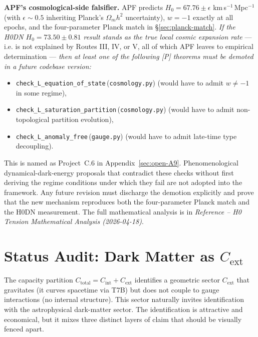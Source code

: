 \documentclass[11pt]{article}
\newcommand{\coderef}[2]{\texttt{#1}\,(\texttt{#2})}
\begin{document}
\begin{apfbox}
\textbf{APF's cosmological-side falsifier.} APF predicts
$H_0 = 67.76 \pm \epsilon$ km\,s$^{-1}$\,Mpc$^{-1}$ (with $\epsilon \sim
0.5$ inheriting Planck's $\Omega_m h^2$ uncertainty), $w = -1$ exactly
at all epochs, and the four-parameter Planck match in
\S\ref{sec:planck-match}. \emph{If the H0DN $H_0 = 73.50 \pm 0.81$
result stands as the true local cosmic expansion rate} --- i.e. is not
explained by Routes III, IV, or V, all of which APF leaves to empirical
determination --- \emph{then at least one of the following [P] theorems
must be demoted in a future codebase version:}
\begin{itemize}[leftmargin=1.5em,nosep]
    \item \coderef{check\_L\_equation\_of\_state}{cosmology.py}
    (would have to admit $w \neq -1$ in some regime),
    \item \coderef{check\_L\_saturation\_partition}{cosmology.py}
    (would have to admit non-topological partition evolution),
    \item \coderef{check\_L\_anomaly\_free}{gauge.py} (would have to
    admit late-time type decoupling).
\end{itemize}
This is named as Project~C.6 in Appendix~\ref{sec:open-A9}.
Phenomenological dynamical-dark-energy proposals that contradict these
checks without first deriving the regime conditions under which they
fail are not adopted into the framework. Any future revision must
discharge the demotion explicitly and prove that the new mechanism
reproduces both the four-parameter Planck match and the H0DN
measurement. The full mathematical analysis is in
\emph{Reference -- H0 Tension Mathematical Analysis (2026-04-18)}.
\end{apfbox}

\section{Status Audit: Dark Matter as $C_{\mathrm{ext}}$}\label{sec:DM}

The capacity partition $C_{\mathrm{total}} = C_{\mathrm{int}} + C_{\mathrm{ext}}$
identifies a geometric sector $C_{\mathrm{ext}}$ that gravitates (it curves
spacetime via T7B) but does not couple to gauge interactions (no internal
structure). This sector naturally invites identification with the astrophysical
dark-matter sector. The identification is attractive and economical, but it
mixes three distinct layers of claim that should be visually fenced apart.
\end{document}
